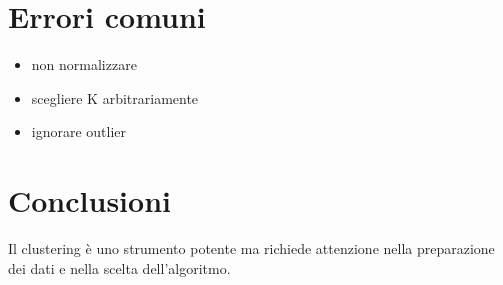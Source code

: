\documentclass[12pt,a4paper]{article}
\begin{document}
	\section{Errori comuni}
	
	\begin{itemize}
		\item non normalizzare
		\item scegliere K arbitrariamente
		\item ignorare outlier
	\end{itemize}
	
	\section{Conclusioni}
	
	Il clustering è uno strumento potente ma richiede attenzione nella preparazione dei dati e nella scelta dell'algoritmo.
	
\end{document}
